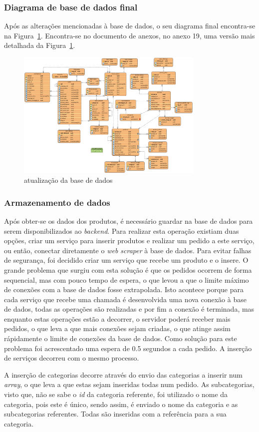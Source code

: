 \subsubsection{Diagrama de base de dados final}

Após as alterações mencionadas à base de dados, o seu diagrama final encontra-se na Figura~\ref{webscraper_bd}. Encontra-se no documento de anexos, no anexo 19, uma versão mais detalhada da Figura~\ref*{webscraper_bd}.

\begin{figure}[htb]
  \centering
  \includegraphics[width=0.8\textwidth]{images/diagramas/bd_final.png}
  \caption{atualização da base de dados}
  \label{webscraper_bd}
\end{figure}


\subsubsection{Armazenamento de dados}

Após obter-se os dados dos produtos, é necessário guardar na base de dados para serem disponibilizados ao \textit{backend}. Para realizar esta operação existiam duas opções, criar um serviço para inserir produtos e realizar um pedido a este serviço, ou então, conectar diretamente o \textit{web scraper} à base de dados. Para evitar falhas de segurança, foi decidido criar um serviço que recebe um produto e o insere. O grande problema que surgiu com esta solução é que os pedidos ocorrem de forma sequencial, mas com pouco tempo de espera, o que levou a que o limite máximo de conexões com a base de dados fosse extrapolada. Isto acontece porque para cada serviço que recebe uma chamada é desenvolvida uma nova conexão à base de dados, todas as operações são realizadas e por fim a conexão é terminada, mas enquanto estas operações estão a decorrer, o servidor poderá receber mais pedidos, o que leva a que mais conexões sejam criadas, o que atinge assim rápidamente o limite de conexões da base de dados. Como solução para este problema foi acrescentado uma espera de 0.5 segundos a cada pedido. A inserção de serviços decorreu com o mesmo processo.

A inserção de categorias decorre através do envio das categorias a inserir num \textit{array}, o que leva a que estas sejam inseridas todas num pedido. As subcategorias, visto que, não se sabe o \textit{id} da categoria referente, foi utilizado o nome da categoria, pois este é único, sendo assim, é enviado o nome da categoria e as subcategorias referentes. Todas são inseridas com a referência para a sua categoria.
